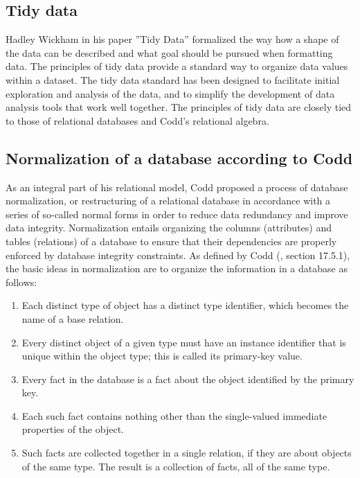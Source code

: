 \subsection{Tidy data} \label{subsec:tidy_data}

Hadley Wickham in his paper ''Tidy Data''\cite{Wickham2014} formalized the way how a shape of the data can be described and what goal should be pursued when formatting data.
The principles of tidy data provide a standard way to organize data values within a dataset.
The tidy data standard has been designed to facilitate initial exploration and analysis of the data, and to simplify the development of data analysis tools that work well together.
The principles of tidy data are closely tied to those of relational databases and Codd's relational algebra\cite{Codd1990}.

\subsection{Normalization of a database according to Codd} \label{subsec:db_norm}

As an integral part of his relational model, Codd proposed a process of database normalization, or restructuring of a relational database in accordance with a series of so-called normal forms in order to reduce data redundancy and improve data integrity.
Normalization entails organizing the columns (attributes) and tables (relations) of a database to ensure that their dependencies are properly enforced by database integrity constraints.
As defined by Codd (\cite{Codd1990}, section 17.5.1), the basic ideas in normalization are to organize the information in a database as follows:

\begin{enumerate}
    \item Each distinct type of object has a distinct type identifier, which becomes the name of a base relation.
    \item Every distinct object of a given type must have an instance identifier that is unique within the object type;
    this is called its primary-key value.
    \item Every fact in the database is a fact about the object identified by the primary key.
    \item Each such fact contains nothing other than the single-valued immediate properties of the object.
    \item Such facts are collected together in a single relation, if they are about objects of the same type.
    The result is a collection of facts, all of the same type.
\end{enumerate}

